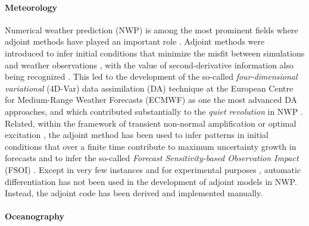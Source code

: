 
\paragraph{Meteorology}

Numerical weather prediction (NWP) is among the most prominent fields where adjoint methods have played an important role \cite{Errico_1997}. 
Adjoint methods were introduced to infer initial conditions that minimize the misfit between simulations and weather observations \cite{Talagrand.1987,Courtier.1987}, with the value of second-derivative information also being recognized \cite{Dimet.2002}. 
This led to the development of the so-called \textit{four-dimensional variational} (4D-Var) data assimilation (DA) technique \cite{Rabier.1992,Rabier:2000uu} at the European Centre for Medium-Range Weather Forecasts (ECMWF) as one the most advanced DA approaches, and which contributed substantially to the \textit{quiet revolution} in NWP \cite{Bauer.2015}.
Related, within the framework of transient non-normal amplification or optimal excitation \cite{Farrell.1988,Farrell:1996jx}, the adjoint method has been used to infer patterns in initial conditions that over a finite time contribute to maximum uncertainty growth in forecasts \cite{Palmer:1994br,Buizza:1995in} and to infer the so-called \textit{Forecast Sensitivity-based Observation Impact} (FSOI) \cite{Langland:2004jo}.
Except in very few instances and for experimental purposes \cite{Giering.2006}, automatic differentiation has not been used in the development of adjoint models in NWP.
Instead, the adjoint code has been derived and implemented manually.

\paragraph{Oceanography}

